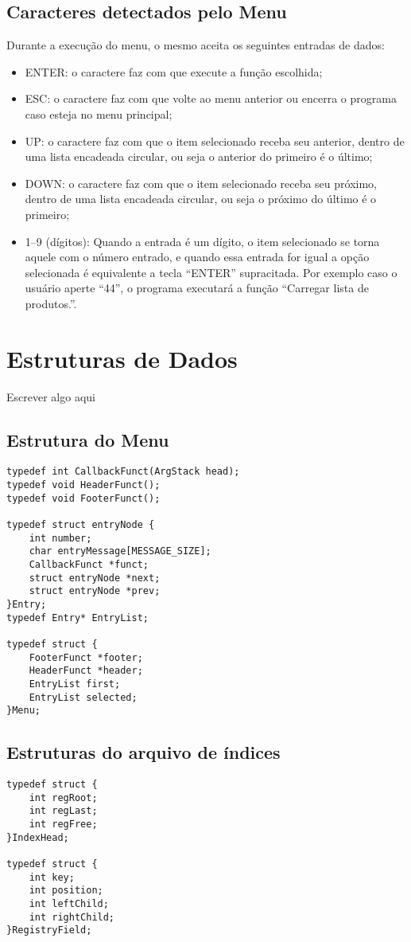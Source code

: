 \documentclass[12pt, a4paper]{article}
\begin{document}
\subsection{Caracteres detectados pelo Menu}\label{Caracteres detectados pelo Menu}
Durante a execução do menu, o mesmo aceita os seguintes entradas de dados:
\begin{itemize}
    \item ENTER\@: o caractere faz com que execute a função escolhida;
    \item ESC\@: o caractere faz com que volte ao menu anterior ou encerra o programa caso esteja no menu principal;
    \item UP\@: o caractere faz com que o item selecionado receba seu anterior, dentro de uma lista encadeada circular, ou seja o anterior do primeiro é o último;
    \item DOWN\@: o caractere faz com que o item selecionado receba seu próximo, dentro de uma lista encadeada circular, ou seja o próximo do último é o primeiro;
    \item 1--9 (dígitos): Quando a entrada é um dígito, o item selecionado se torna aquele com o número entrado, e quando essa entrada for igual a opção selecionada é equivalente a tecla ``ENTER'' supracitada. Por exemplo caso o usuário aperte ``44'', o programa executará a função ``Carregar lista de produtos.''.
\end{itemize}

\section{Estruturas de Dados}\label{Estruturas de Dados}
Escrever algo aqui
\subsection{Estrutura do Menu}\label{Estrutura do Menu}
\begin{lstlisting}
typedef int CallbackFunct(ArgStack head);
typedef void HeaderFunct();
typedef void FooterFunct();

typedef struct entryNode {
    int number;
	char entryMessage[MESSAGE_SIZE];
    CallbackFunct *funct;
    struct entryNode *next;
    struct entryNode *prev;
}Entry;
typedef Entry* EntryList;

typedef struct {
    FooterFunct *footer;
    HeaderFunct *header;
    EntryList first;
    EntryList selected;
}Menu;
\end{lstlisting}
\subsection{Estruturas do arquivo de índices}\label{Estruturas do arquivo de índices}
\begin{lstlisting}[title=Dados gravados no arquivo ``index.bin'']
typedef struct {
    int regRoot;
    int regLast;
    int regFree;
}IndexHead;

typedef struct {
    int key;
    int position;
    int leftChild;
    int rightChild;
}RegistryField;
\end{lstlisting}
\end{document}
